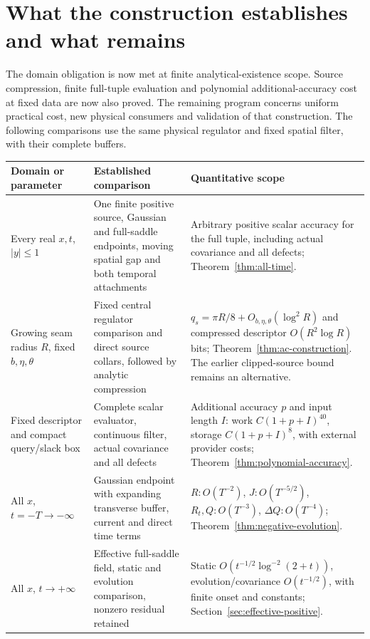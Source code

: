 \section{What the construction establishes and what remains}
\label{sec:remaining}
The domain obligation is now met at finite analytical-existence scope.
Source compression, finite full-tuple evaluation and polynomial
additional-accuracy cost at fixed data are now also proved. The remaining
program concerns uniform practical cost, new physical consumers and
validation of that construction. The following comparisons use the same physical
regulator and fixed spatial filter, with their complete buffers.

\begingroup\small
\begin{longtable}{@{}>{\raggedright\arraybackslash}p{}>{\raggedright\arraybackslash}p{}>{\raggedright\arraybackslash}p{}@{}}
\toprule Domain or parameter & Established comparison & Quantitative scope\\\midrule\endhead
Every real $x,t$, $|y|\le1$ & One finite positive source, Gaussian and
full-saddle endpoints, moving spatial gap and both temporal attachments &
Arbitrary positive scalar accuracy for the full tuple, including actual
covariance and all defects; Theorem~\ref{thm:all-time}.\\
Growing seam radius $R$, fixed $b,\eta,\theta$ & Fixed central regulator
comparison and direct source collars, followed by analytic compression &
$q_s=\pi R/8+O_{b,\eta,\theta}(\log^2R)$ and compressed descriptor
$O(R^2\log R)$ bits; Theorem~\ref{thm:ac-construction}. The earlier
clipped-source bound remains an alternative.\\
Fixed descriptor and compact query/slack box & Complete scalar evaluator,
continuous filter, actual covariance and all defects & Additional accuracy
$p$ and input length $I$: work $C(1+p+I)^{40}$, storage $C(1+p+I)^8$,
with external provider costs; Theorem~\ref{thm:polynomial-accuracy}.\\
All $x$, $t=-T\to-\infty$ & Gaussian endpoint with expanding transverse
buffer, current and direct time terms &
$R:O(T^{-2})$, $J:O(T^{-5/2})$, $R_t,Q:O(T^{-3})$,
$\Delta Q:O(T^{-4})$; Theorem~\ref{thm:negative-evolution}.\\
All $x$, $t\to+\infty$ & Effective full-saddle field, static and evolution
comparison, nonzero residual retained &
Static $O(t^{-1/2}\log^{-2}(2+t))$, evolution/covariance
$O(t^{-1/2})$, with finite onset and constants;
Section~\ref{sec:effective-positive}.\\

\end{longtable}

